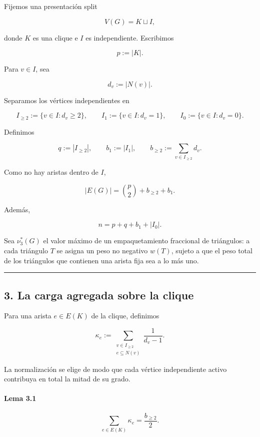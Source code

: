 \documentclass[
  spanish,
  11pt,
  a4paper,
]{article}
\begin{document}
Fijemos una presentación split

\[
V(G)=K\sqcup I,
\]

donde \(K\) es una clique e \(I\) es independiente. Escribimos

\[
p:=|K|.
\]

Para \(v\in I\), sea

\[
d_v:=|N(v)|.
\]

Separamos los vértices independientes en

\[
I_{\ge2}:=\{v\in I:d_v\ge2\},
\qquad
I_1:=\{v\in I:d_v=1\},
\qquad
I_0:=\{v\in I:d_v=0\}.
\]

Definimos

\[
q:=|I_{\ge2}|,
\qquad
b_1:=|I_1|,
\qquad
b_{\ge2}:=\sum_{v\in I_{\ge2}}d_v.
\]

Como no hay aristas dentro de \(I\),

\[
|E(G)|
=
\binom{p}{2}+b_{\ge2}+b_1.
\tag{2.1}
\]

Además,

\[
n=p+q+b_1+|I_0|.
\tag{2.2}
\]

Sea \(\nu_3^*(G)\) el valor máximo de un empaquetamiento fraccional de triángulos: a cada triángulo \(T\) se asigna un peso no negativo \(w(T)\), sujeto a que el peso total de los triángulos que contienen una arista fija sea a lo más uno.

\begin{center}\rule{0.5\linewidth}{0.5pt}\end{center}

\subsection{3. La carga agregada sobre la clique}\label{la-carga-agregada-sobre-la-clique}

Para una arista \(e\in E(K)\) de la clique, definimos

\[
\kappa_e
:=
\sum_{\substack{v\in I_{\ge2}\\ e\subseteq N(v)}}
\frac{1}{d_v-1}.
\tag{3.1}
\]

La normalización se elige de modo que cada vértice independiente activo contribuya en total la mitad de su grado.

\paragraph{Lema 3.1}\label{lema-3.1}

\[
\sum_{e\in E(K)}\kappa_e
=
\frac{b_{\ge2}}2.
\]
\end{document}
